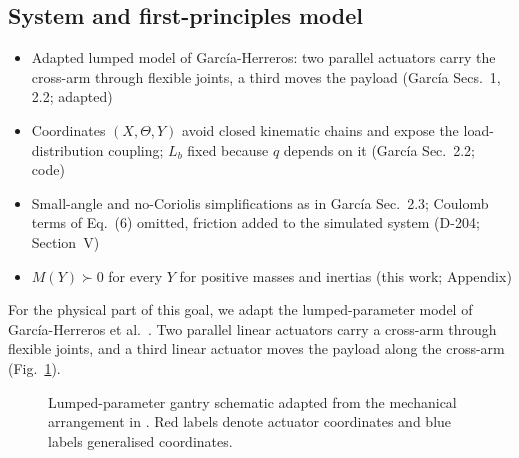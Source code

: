 \subsection{System and first-principles model}\label{sec:system}
\ifdraft
\begin{itemize}
\item Adapted lumped model of Garc\'ia-Herreros: two parallel actuators carry the cross-arm through flexible joints, a third moves the payload (Garc\'ia Secs.~1, 2.2; adapted)
\item Coordinates $(X,\Theta,Y)$ avoid closed kinematic chains and expose the load-distribution coupling; $L_b$ fixed because $q$ depends on it (Garc\'ia Sec.~2.2; code)
\item Small-angle and no-Coriolis simplifications as in Garc\'ia Sec.~2.3; Coulomb terms of Eq.~(6) omitted, friction added to the simulated system (D-204; Section~V)
\item $M(Y)\succ0$ for every $Y$ for positive masses and inertias (this work; Appendix)
\end{itemize}
\fi

For the physical part of this goal, we adapt the lumped-parameter model of
Garc\'ia-Herreros et al.~\cite[Sec.~2.2]{garcia2013model}.
Two parallel linear actuators carry a cross-arm through flexible joints, and
a third linear actuator moves the payload along the
cross-arm~\cite[Sec.~1]{garcia2013model} (Fig.~\ref{fig:gantry_system}).

\begin{figure}[b]
  \centering
  \def\gantryabsorber{0}%
  \resizebox{\columnwidth}{!}{}
  \caption{Lumped-parameter gantry schematic adapted from the mechanical
  arrangement in \cite{garcia2013model}. Red labels denote actuator coordinates
  and blue labels generalised coordinates.}
  \label{fig:gantry_system}
\end{figure}

